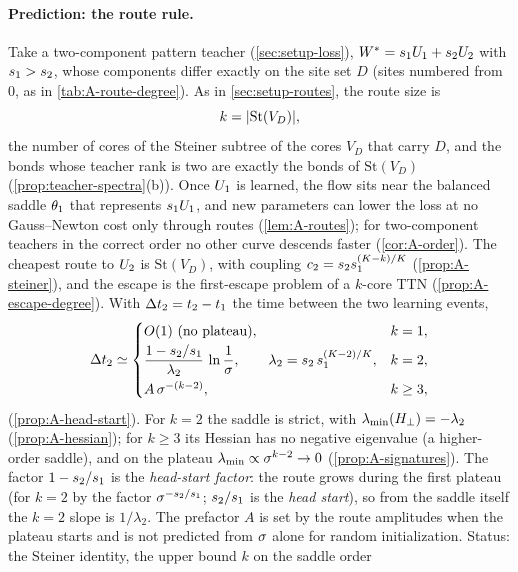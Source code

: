 \paragraph{Prediction: the route rule.}
Take a two-component pattern teacher (\cref{sec:setup-loss}), $W^{*}=s_{1}U_{1}+s_{2}U_{2}$ with $s_{1}>s_{2}$, whose
components differ exactly on the site set $D$ (sites numbered from $0$, as in \cref{tab:A-route-degree}). As in
\cref{sec:setup-routes}, the route size is
\begin{equation}\label{eq:locality-k}
  k=\lvert\mathrm{St}(V_D)\rvert,
\end{equation}
the number of cores of the Steiner subtree of the cores $V_D$ that carry $D$, and the bonds whose teacher rank
is two are exactly the bonds of $\mathrm{St}(V_D)$ (\cref{prop:teacher-spectra}(b)). Once $U_{1}$ is learned, the
flow sits near the balanced saddle $\theta_1$ that represents $s_{1}U_{1}$, and new parameters can lower the loss
at no Gauss--Newton cost only through routes (\cref{lem:A-routes}); for two-component teachers in the correct
order no other curve descends faster (\cref{cor:A-order}). The cheapest route to $U_{2}$ is
$\mathrm{St}(V_D)$, with coupling $c_2=s_{2}s_{1}^{(K-k)/K}$ (\cref{prop:A-steiner}), and the escape is the
first-escape problem of a $k$-core TTN (\cref{prop:A-escape-degree}). With $\Delta t_2=t_{2}-t_{1}$ the time
between the two learning events,
\begin{equation}\label{eq:locality-rule}
  \Delta t_2\simeq
  \begin{cases}
    O(1)\ \text{(no plateau)}, & k=1,\\[0.5ex]
    \dfrac{1-s_{2}/s_{1}}{\lambda_2}\,\ln\dfrac1{\sigma},\qquad \lambda_2=s_{2}\,s_{1}^{(K-2)/K}, & k=2,\\[1.5ex]
    A\,\sigma^{-(k-2)}, & k\ge3,
  \end{cases}
\end{equation}
(\cref{prop:A-head-start}). For $k=2$ the saddle is strict, with $\lambda_{\min}(H_{\perp})=-\lambda_2$
(\cref{prop:A-hessian}); for $k\ge3$ its Hessian has no negative eigenvalue (a higher-order saddle), and on the
plateau $\lambda_{\min}\propto\sigma^{k-2}\to0$ (\cref{prop:A-signatures}). The factor $1-s_{2}/s_{1}$ is the
\emph{head-start factor}: the route grows during the first plateau (for $k=2$ by the factor $\sigma^{-s_{2}/s_{1}}$;
$s_{2}/s_{1}$ is the \emph{head start}), so from the saddle itself the $k=2$ slope is $1/\lambda_2$. The prefactor $A$ is set by the route amplitudes when the plateau starts and is not predicted
from $\sigma$ alone for random initialization. Status: the Steiner identity, the upper bound $k$ on the saddle order
